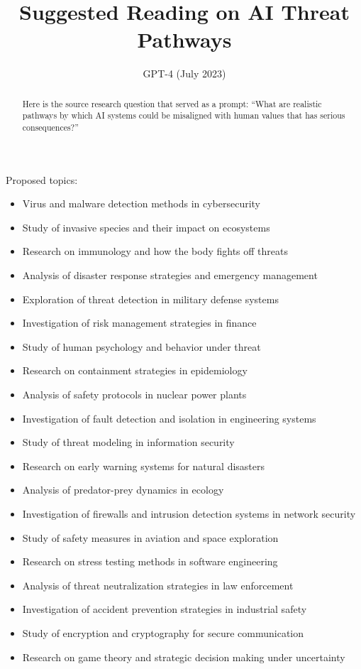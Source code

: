 \documentclass{article}
\title{Suggested Reading on AI Threat Pathways
}
\date{}
\author{\hspace{1mm}GPT-4 (July 2023)}%
\begin{document}
\maketitle

\begin{abstract}
Here is the source research question that served as a prompt: ``What are realistic pathways by which AI systems could be misaligned with human values that has serious consequences?''
\end{abstract}


Proposed topics:
\begin{itemize}
\item Virus and malware detection methods in cybersecurity
\item Study of invasive species and their impact on ecosystems
\item Research on immunology and how the body fights off threats
\item Analysis of disaster response strategies and emergency management
\item Exploration of threat detection in military defense systems
\item Investigation of risk management strategies in finance
\item Study of human psychology and behavior under threat
\item Research on containment strategies in epidemiology
\item Analysis of safety protocols in nuclear power plants
\item Investigation of fault detection and isolation in engineering systems
\item Study of threat modeling in information security
\item Research on early warning systems for natural disasters
\item Analysis of predator-prey dynamics in ecology
\item Investigation of firewalls and intrusion detection systems in network security
\item Study of safety measures in aviation and space exploration
\item Research on stress testing methods in software engineering
\item Analysis of threat neutralization strategies in law enforcement
\item Investigation of accident prevention strategies in industrial safety
\item Study of encryption and cryptography for secure communication
\item Research on game theory and strategic decision making under uncertainty
\end{itemize}
\end{document}
